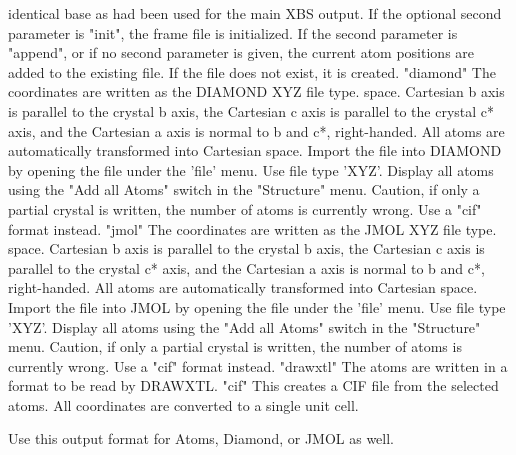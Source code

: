 \begin{MacVerbatim}
           identical base as had been used for the main XBS output.
           If the optional second parameter is "init", the frame file
           is initialized.
           If the second parameter is "append", or if no
           second parameter is given, the current atom positions
           are added to the existing file. If the file does not
           exist, it is created.
"diamond"  The coordinates are written as the DIAMOND XYZ file type.
           space. Cartesian b axis is parallel to the crystal b axis,
           the Cartesian c axis is parallel to the crystal c* axis,
           and the Cartesian a axis is normal to b and c*, right-handed.
           All atoms are automatically transformed into Cartesian
           space. Import the file into DIAMOND by opening the file
           under the 'file' menu. Use file type 'XYZ'. Display all
           atoms using the "Add all Atoms" switch in the "Structure"
           menu.
           Caution, if only a partial crystal is written, the number
           of atoms is currently wrong. Use a "cif" format instead.
"jmol"     The coordinates are written as the JMOL XYZ file type.
           space. Cartesian b axis is parallel to the crystal b axis,
           the Cartesian c axis is parallel to the crystal c* axis,
           and the Cartesian a axis is normal to b and c*, right-handed.
           All atoms are automatically transformed into Cartesian
           space. Import the file into JMOL by opening the file
           under the 'file' menu. Use file type 'XYZ'. Display all
           atoms using the "Add all Atoms" switch in the "Structure"
           menu.
           Caution, if only a partial crystal is written, the number
           of atoms is currently wrong. Use a "cif" format instead.
"drawxtl"  The atoms are written in a format to be read by DRAWXTL.
"cif"      This creates a CIF file from the selected atoms. All
           coordinates are converted to a single unit cell.

           Use this output format for Atoms, Diamond, or JMOL as well.
\end{MacVerbatim}
